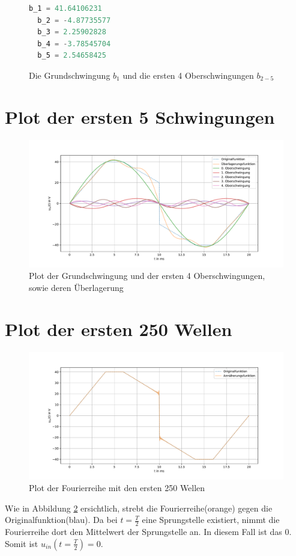 \documentclass[11pt]{scrartcl}
\begin{document}
\begin{figure}[!htb]
  \centering
\begin{lstlisting}[language=Python]
  b_1 = 41.64106231
  b_2 = -4.87735577
  b_3 = 2.25902828
  b_4 = -3.78545704
  b_5 = 2.54658425
\end{lstlisting}
\caption{Die Grundschwingung $b_1$ und die ersten 4 Oberschwingungen $b_{2-5}$}
\end{figure}
\newpage
\section{Plot der ersten 5 Schwingungen}
\begin{figure}[!htb]
    \begin{center}
      \includegraphics[width=1.1\linewidth]{./Figures/plot_1.pdf}
    \caption{Plot der Grundschwingung und der ersten 4 Oberschwingungen, sowie deren Überlagerung}
    \label{fig:plot_1}
  \end{center}
\end{figure}
\newpage
\section{Plot der ersten 250 Wellen}
\begin{figure}[!htb]
    \begin{center}
      \includegraphics[width=1.1\linewidth]{./Figures/plot_2.pdf}
    \caption{Plot der Fourierreihe mit den ersten 250 Wellen}
    \label{fig:plot_2}
  \end{center}
\end{figure}
Wie in Abbildung \ref{fig:plot_2} ersichtlich, strebt die Fourierreihe(orange) gegen die Originalfunktion(blau). Da bei $t=\frac{T}{2}$ eine Sprungstelle existiert, nimmt die Fourierreihe dort den Mittelwert der Sprungstelle an. In diesem Fall ist das 0.
Somit ist $u_{in}(t=\frac{T}{2}) = 0$.
\end{document}
